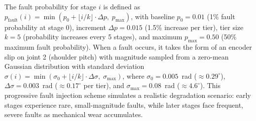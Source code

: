 \documentclass[12pt,a4paper,oneside]{report}
\begin{document}
The fault probability for stage $i$ is defined as $p_{\text{fault}}(i) = \min(p_0 + \lfloor i/k \rfloor \cdot \Delta p,\; p_{\text{max}})$, with baseline $p_0 = 0.01$ (1\% fault probability at stage 0), increment $\Delta p = 0.015$ (1.5\% increase per tier), tier size $k = 5$ (probability increases every 5 stages), and maximum $p_{\text{max}} = 0.50$ (50\% maximum fault probability). When a fault occurs, it takes the form of an encoder slip on joint 2 (shoulder pitch) with magnitude sampled from a zero-mean Gaussian distribution with standard deviation $\sigma(i) = \min(\sigma_0 + \lfloor i/k \rfloor \cdot \Delta \sigma,\; \sigma_{\text{max}})$, where $\sigma_0 = 0.005$~rad ($\approx 0.29^\circ$), $\Delta \sigma = 0.003$~rad ($\approx 0.17^\circ$ per tier), and $\sigma_{\text{max}} = 0.08$~rad ($\approx 4.6^\circ$). This progressive fault injection scheme simulates a realistic degradation scenario: early stages experience rare, small-magnitude faults, while later stages face frequent, severe faults as mechanical wear accumulates.
\end{document}
